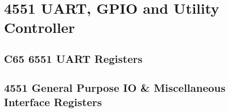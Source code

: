 \chapter{4551 UART, GPIO and Utility Controller}

\section{C65 6551 UART Registers}



\section{4551 General Purpose IO \& Miscellaneous Interface Registers}
\label{sec:uartmisc}


